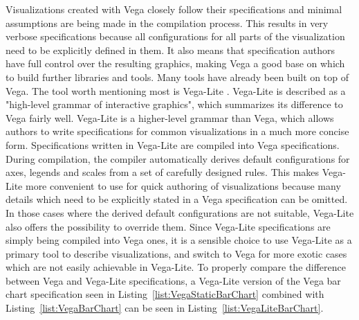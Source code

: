 Visualizations created with Vega closely follow their specifications
and minimal assumptions are being made in the compilation process.
This results in very verbose specifications because all configurations
for all parts of the visualization need to be explicitly defined in
them.  It also means that specification authors have full control over
the resulting graphics, making Vega a good base on which to build
further libraries and tools.  Many tools
\parencite{Voyager,Lyra,CompassQL} have already been built on top of
Vega.  The tool worth mentioning most is Vega-Lite
\parencite{VegaLite}.  Vega-Lite is described as a "high-level grammar
of interactive graphics", which summarizes its difference to Vega
fairly well.  Vega-Lite is a higher-level grammar than Vega, which
allows authors to write specifications for common visualizations in a
much more concise form.  Specifications written in Vega-Lite are
compiled into Vega specifications.  During compilation, the compiler
automatically derives default configurations for axes, legends and
scales from a set of carefully designed rules.  This makes Vega-Lite
more convenient to use for quick authoring of visualizations because
many details which need to be explicitly stated in a Vega
specification can be omitted.  In those cases where the derived
default configurations are not suitable, Vega-Lite also offers the
possibility to override them.  Since Vega-Lite specifications are
simply being compiled into Vega ones, it is a sensible choice to use
Vega-Lite as a primary tool to describe visualizations, and switch to
Vega for more exotic cases which are not easily achievable in
Vega-Lite.  To properly compare the difference between Vega and
Vega-Lite specifications, a Vega-Lite version of the Vega bar chart
specification seen in Listing~\ref{list:VegaStaticBarChart} combined
with Listing~\ref{list:VegaBarChart} can be seen in
Listing~\ref{list:VegaLiteBarChart}.


\begin{samepage}
 
    This is a Vega-Lite specification of the Vega bar chart specification seen in Listing~\ref{list:VegaStaticBarChart} combined with Listing~\ref{list:VegaBarChart}.
  },
]{listings/vega-lite-bar-chart.json}
\end{samepage}




